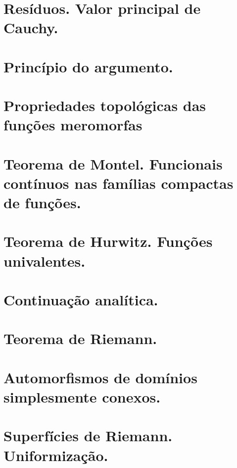 \section{Resíduos. Valor principal de Cauchy.}

\section{Princípio do argumento.}
\begin{defin}
\end{defin}
\begin{teorema}
\end{teorema}
\begin{teorema}[Rouché]
\end{teorema}
\begin{cor}
\end{cor}

\section{Propriedades topológicas das funções meromorfas}

\section{Teorema de Montel. Funcionais contínuos nas famílias compactas de funções.}

\section{Teorema de Hurwitz. Funções univalentes.}

\section{Continuação analítica.}

\section{Teorema de Riemann.}

\section{Automorfismos de domínios simplesmente conexos.}

\section{Superfícies de Riemann. Uniformização.}

